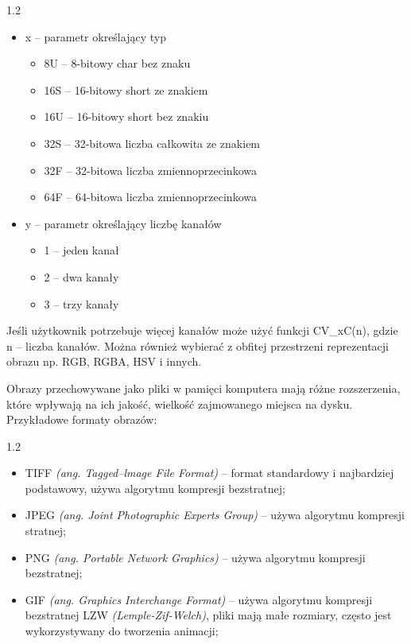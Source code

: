 \documentclass[a4paper,12pt]{article}
\newcommand\spacingInSolemnItemize{1.2}
\begin{document}
				\begin{spacing}{\spacingInSolemnItemize}
					\begin{itemize}
						\item{x -- parametr określający typ}
							\begin{itemize}
								\item{8U -- 8-bitowy char bez znaku}
								\item{16S -- 16-bitowy short ze znakiem}
								\item{16U -- 16-bitowy short bez znakiu}
								\item{32S -- 32-bitowa liczba całkowita ze znakiem}
								\item{32F -- 32-bitowa liczba zmiennoprzecinkowa}
								\item{64F -- 64-bitowa liczba zmiennoprzecinkowa}
							\end{itemize}
						\item{y  -- parametr określający liczbę kanałów}
							\begin{itemize}
								\item{1 -- jeden kanał}
								\item{2 -- dwa kanały}
								\item{3 -- trzy kanały}
							\end{itemize}
					\end{itemize}	
				\end{spacing} Jeśli użytkownik potrzebuje więcej kanałów może użyć funkcji CV\_xC(n), gdzie n -- liczba kanałów. Można również wybierać 
				z obfitej przestrzeni reprezentacji obrazu np. RGB, RGBA, HSV i innych. 
			
			 Obrazy przechowywane jako pliki w pamięci komputera mają różne rozszerzenia, które wpływają na ich jakość, 
				wielkość zajmowanego miejsca na dysku. Przykładowe formaty obrazów: 
			
				\begin{spacing}{\spacingInSolemnItemize}
					\begin{itemize}
						\item TIFF \textit{(ang. Tagged--lmage File Format)} -- format standardowy i najbardziej podstawowy, używa algorytmu kompresji bezstratnej;
						\item JPEG \textit{(ang. Joint Photographic Experts Group)} -- używa algorytmu kompresji stratnej;
						\item PNG \textit{(ang. Portable Network Graphics)} -- używa algorytmu kompresji bezstratnej; 
						\item GIF \textit{(ang. Graphics Interchange Format)} -- używa algorytmu kompresji bezstratnej LZW \textit{(Lemple-Zif-Welch)}, 
							pliki mają małe rozmiary, często jest wykorzystywany do tworzenia animacji;
					\end{itemize}
				\end{spacing}
    
\end{document}
